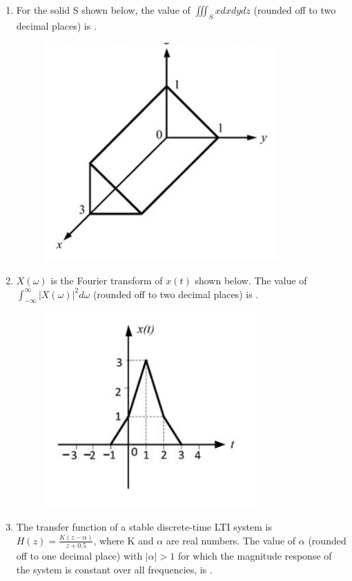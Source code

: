 \documentclass[a4paper, 11pt]{article}
\begin{document}
\begin{enumerate}
    \hfill{}

    \item For the solid S shown below, the value of $\iiint_S x dxdydz$ (rounded off to two decimal places) is \underline{\hspace{2cm}}.
    \begin{figure}[H]
        \centering
        \includegraphics[width=0.4\columnwidth]{figs/Q51.png}
        \caption*{}
        \label{fig:q61}
    \end{figure}
    
    \hfill{}

    \item $X(\omega)$ is the Fourier transform of $x(t)$ shown below. The value of $\int_{-\infty}^{\infty} |X(\omega)|^2 d\omega$ (rounded off to two decimal places) is \underline{\hspace{2cm}}.
    \begin{figure}[H]
        \centering
        \includegraphics[width=0.4\columnwidth]{figs/Q52.png}
        \caption*{}
        \label{fig:q62}
    \end{figure}

    \hfill{}

    \item The transfer function of a stable discrete-time LTI system is $H(z) = \frac{K(z-\alpha)}{z+0.5}$, where K and $\alpha$ are real numbers. The value of $\alpha$ (rounded off to one decimal place) with $|\alpha|>1$ for which the magnitude response of the system is constant over all frequencies, is \underline{\hspace{2cm}}.


\end{enumerate}
\end{document}
